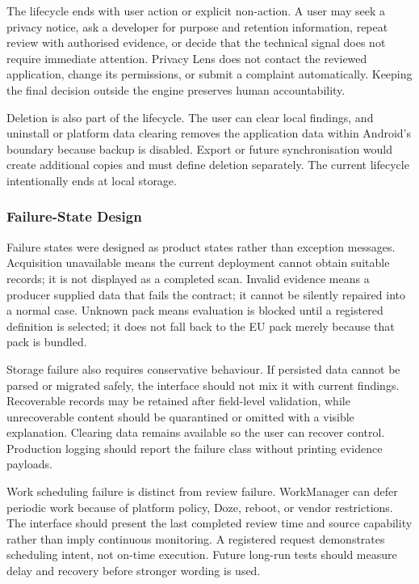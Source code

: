 The lifecycle ends with user action or explicit non-action. A user may seek a privacy notice, ask a developer for purpose and retention information, repeat review with authorised evidence, or decide that the technical signal does not require immediate attention. Privacy Lens does not contact the reviewed application, change its permissions, or submit a complaint automatically. Keeping the final decision outside the engine preserves human accountability.

Deletion is also part of the lifecycle. The user can clear local findings, and uninstall or platform data clearing removes the application data within Android's boundary because backup is disabled. Export or future synchronisation would create additional copies and must define deletion separately. The current lifecycle intentionally ends at local storage.

\subsubsection{Failure-State Design}

Failure states were designed as product states rather than exception messages. Acquisition unavailable means the current deployment cannot obtain suitable records; it is not displayed as a completed scan. Invalid evidence means a producer supplied data that fails the contract; it cannot be silently repaired into a normal case. Unknown pack means evaluation is blocked until a registered definition is selected; it does not fall back to the EU pack merely because that pack is bundled.

Storage failure also requires conservative behaviour. If persisted data cannot be parsed or migrated safely, the interface should not mix it with current findings. Recoverable records may be retained after field-level validation, while unrecoverable content should be quarantined or omitted with a visible explanation. Clearing data remains available so the user can recover control. Production logging should report the failure class without printing evidence payloads.

Work scheduling failure is distinct from review failure. WorkManager can defer periodic work because of platform policy, Doze, reboot, or vendor restrictions. The interface should present the last completed review time and source capability rather than imply continuous monitoring. A registered request demonstrates scheduling intent, not on-time execution. Future long-run tests should measure delay and recovery before stronger wording is used.

